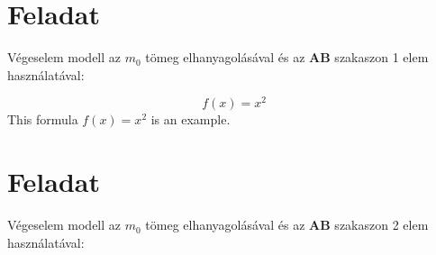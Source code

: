 \documentclass{article}
\begin{document}
	\newpage
	
	\section{Feladat}
	
	Végeselem modell az $m_{0}$ tömeg elhanyagolásával és az \textbf{AB} szakaszon 1 elem használatával:
	\begin{figure}[h!]		
		\begin{center}	
		\end{center}	
	\caption{}
	\end{figure}
	
	
	\begin{equation}
	f(x)=x^2
	\end{equation}
	This formula $f(x) = x^2$ is an example.
	
	\section{Feladat}
		
	Végeselem modell az $m_{0}$ tömeg elhanyagolásával és az \textbf{AB} szakaszon 2 elem használatával:
	
\end{document}
